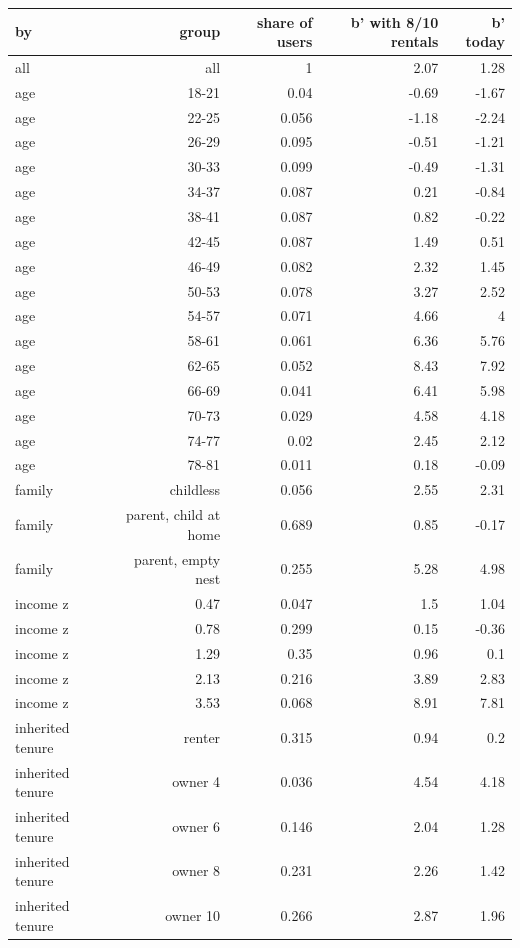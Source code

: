 \begin{tabular}{lrrrr}
\toprule
by & group & share of users & b' with 8/10 rentals & b' today \\
\midrule
all & all & 1 & 2.07 & 1.28 \\
age & 18-21 & 0.04 & -0.69 & -1.67 \\
age & 22-25 & 0.056 & -1.18 & -2.24 \\
age & 26-29 & 0.095 & -0.51 & -1.21 \\
age & 30-33 & 0.099 & -0.49 & -1.31 \\
age & 34-37 & 0.087 & 0.21 & -0.84 \\
age & 38-41 & 0.087 & 0.82 & -0.22 \\
age & 42-45 & 0.087 & 1.49 & 0.51 \\
age & 46-49 & 0.082 & 2.32 & 1.45 \\
age & 50-53 & 0.078 & 3.27 & 2.52 \\
age & 54-57 & 0.071 & 4.66 & 4 \\
age & 58-61 & 0.061 & 6.36 & 5.76 \\
age & 62-65 & 0.052 & 8.43 & 7.92 \\
age & 66-69 & 0.041 & 6.41 & 5.98 \\
age & 70-73 & 0.029 & 4.58 & 4.18 \\
age & 74-77 & 0.02 & 2.45 & 2.12 \\
age & 78-81 & 0.011 & 0.18 & -0.09 \\
family & childless & 0.056 & 2.55 & 2.31 \\
family & parent, child at home & 0.689 & 0.85 & -0.17 \\
family & parent, empty nest & 0.255 & 5.28 & 4.98 \\
income z & 0.47 & 0.047 & 1.5 & 1.04 \\
income z & 0.78 & 0.299 & 0.15 & -0.36 \\
income z & 1.29 & 0.35 & 0.96 & 0.1 \\
income z & 2.13 & 0.216 & 3.89 & 2.83 \\
income z & 3.53 & 0.068 & 8.91 & 7.81 \\
inherited tenure & renter & 0.315 & 0.94 & 0.2 \\
inherited tenure & owner 4 & 0.036 & 4.54 & 4.18 \\
inherited tenure & owner 6 & 0.146 & 2.04 & 1.28 \\
inherited tenure & owner 8 & 0.231 & 2.26 & 1.42 \\
inherited tenure & owner 10 & 0.266 & 2.87 & 1.96 \\
\bottomrule
\end{tabular}
